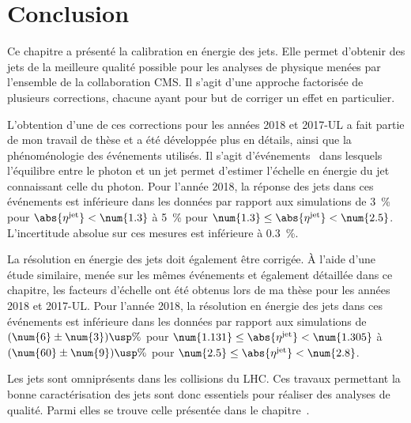 \section{Conclusion}\label{chapter-JERC-section-conclusion}
Ce chapitre a présenté la calibration en énergie des jets.
Elle permet d'obtenir des jets de la meilleure qualité possible pour les analyses de physique menées par l'ensemble de la collaboration CMS.
Il s'agit d'une approche factorisée de plusieurs corrections, chacune ayant pour but de corriger un effet en particulier.
\par L'obtention d'une de ces corrections pour les années 2018 et 2017-UL a fait partie de mon travail de thèse et a été développée plus en détails, ainsi que la phénoménologie des événements utilisés.
Il s'agit d'événements \Gjets\ dans lesquels l'équilibre entre le photon et un jet permet d'estimer l'échelle en énergie du jet connaissant celle du photon.
Pour l'année 2018, la réponse des jets dans ces événements est inférieure dans les données par rapport aux simulations
de
\SI{3}{\%} pour $\abs{\eta^\text{jet}} < \num{1.3}$
à
\SI{5}{\%} pour $\num{1.3} \leq \abs{\eta^\text{jet}} < \num{2.5}$.
L'incertitude absolue sur ces mesures est inférieure à \SI{0.3}{\%}.
\par La résolution en énergie des jets doit également être corrigée.
À l'aide d'une étude similaire, menée sur les mêmes événements et également détaillée dans ce chapitre, les facteurs d'échelle ont été obtenus lors de ma thèse pour les années 2018 et 2017-UL.
Pour l'année 2018, la résolution en énergie des jets dans ces événements est inférieure dans les données par rapport aux simulations
de
$(\num{6}\pm\num{3})\usp\%$ pour $\num{1.131} \leq \abs{\eta^\text{jet}} < \num{1.305}$
à
$(\num{60}\pm\num{9})\usp\%$ pour $\num{2.5} \leq \abs{\eta^\text{jet}} < \num{2.8}$.
\par Les jets sont omniprésents dans les collisions du LHC.
Ces travaux permettant la bonne caractérisation des jets sont donc essentiels pour réaliser des analyses de qualité.
Parmi elles se trouve celle présentée dans le chapitre~.